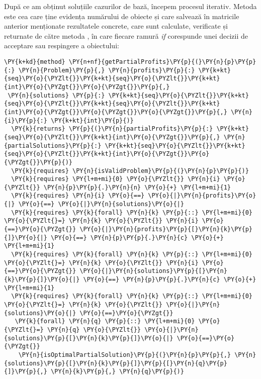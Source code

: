 \begin{sloppypar}
    \par După ce am obținut soluțiile cazurilor de bază, începem procesul iterativ. Metoda  este cea care ține evidența numărului de obiecte și care salvează în matricile anterior menționate rezultatele concrete, care sunt calculate, verificate și returnate de către metoda , în care fiecare ramură \textit{if} corespunde unei decizii de acceptare sau respingere a obiectului:
    \begin{Verbatim}[commandchars=\\\{\}]
\PY{k+kd}{method} \PY{n+nf}{getPartialProfits}\PY{p}{(}\PY{n}{p}\PY{p}{:} \PY{n}{Problem}\PY{p}{,} \PY{n}{profits}\PY{p}{:} \PY{k+kt}{seq}\PY{o}{\PYZlt{}}\PY{k+kt}{seq}\PY{o}{\PYZlt{}}\PY{k+kt}{int}\PY{o}{\PYZgt{}}\PY{o}{\PYZgt{}}\PY{p}{,} 
 \PY{n}{solutions} \PY{p}{:} \PY{k+kt}{seq}\PY{o}{\PYZlt{}}\PY{k+kt}{seq}\PY{o}{\PYZlt{}}\PY{k+kt}{seq}\PY{o}{\PYZlt{}}\PY{k+kt}{int}\PY{o}{\PYZgt{}}\PY{o}{\PYZgt{}}\PY{o}{\PYZgt{}}\PY{p}{,} \PY{n}{i}\PY{p}{:} \PY{k+kt}{int}\PY{p}{)} 
  \PY{k}{returns} \PY{p}{(}\PY{n}{partialProfits}\PY{p}{:} \PY{k+kt}{seq}\PY{o}{\PYZlt{}}\PY{k+kt}{int}\PY{o}{\PYZgt{}}\PY{p}{,} \PY{n}{partialSolutions}\PY{p}{:} \PY{k+kt}{seq}\PY{o}{\PYZlt{}}\PY{k+kt}{seq}\PY{o}{\PYZlt{}}\PY{k+kt}{int}\PY{o}{\PYZgt{}}\PY{o}{\PYZgt{}}\PY{p}{)}
  \PY{k}{requires} \PY{n}{isValidProblem}\PY{p}{(}\PY{n}{p}\PY{p}{)}
  \PY{k}{requires} \PY{l+m+mi}{0} \PY{o}{\PYZlt{}} \PY{n}{i} \PY{o}{\PYZlt{}} \PY{n}{p}\PY{p}{.}\PY{n}{n} \PY{o}{+} \PY{l+m+mi}{1}
  \PY{k}{requires} \PY{n}{i} \PY{o}{==} \PY{o}{|}\PY{n}{profits}\PY{o}{|} \PY{o}{==} \PY{o}{|}\PY{n}{solutions}\PY{o}{|}
  \PY{k}{requires} \PY{k}{forall} \PY{n}{k} \PY{p}{::} \PY{l+m+mi}{0} \PY{o}{\PYZlt{}=} \PY{n}{k} \PY{o}{\PYZlt{}} \PY{n}{i} \PY{o}{==}\PY{o}{\PYZgt{}} \PY{o}{|}\PY{n}{profits}\PY{p}{[}\PY{n}{k}\PY{p}{]}\PY{o}{|} \PY{o}{==} \PY{n}{p}\PY{p}{.}\PY{n}{c} \PY{o}{+} \PY{l+m+mi}{1}
  \PY{k}{requires} \PY{k}{forall} \PY{n}{k} \PY{p}{::} \PY{l+m+mi}{0} \PY{o}{\PYZlt{}=} \PY{n}{k} \PY{o}{\PYZlt{}} \PY{n}{i} \PY{o}{==}\PY{o}{\PYZgt{}} \PY{o}{|}\PY{n}{solutions}\PY{p}{[}\PY{n}{k}\PY{p}{]}\PY{o}{|} \PY{o}{==} \PY{n}{p}\PY{p}{.}\PY{n}{c} \PY{o}{+} \PY{l+m+mi}{1}
  \PY{k}{requires} \PY{k}{forall} \PY{n}{k} \PY{p}{::} \PY{l+m+mi}{0} \PY{o}{\PYZlt{}=} \PY{n}{k} \PY{o}{\PYZlt{}} \PY{o}{|}\PY{n}{solutions}\PY{o}{|} \PY{o}{==}\PY{o}{\PYZgt{}} 
   \PY{k}{forall} \PY{n}{q} \PY{p}{::} \PY{l+m+mi}{0} \PY{o}{\PYZlt{}=} \PY{n}{q} \PY{o}{\PYZlt{}} \PY{o}{|}\PY{n}{solutions}\PY{p}{[}\PY{n}{k}\PY{p}{]}\PY{o}{|} \PY{o}{==}\PY{o}{\PYZgt{}} 
    \PY{n}{isOptimalPartialSolution}\PY{p}{(}\PY{n}{p}\PY{p}{,} \PY{n}{solutions}\PY{p}{[}\PY{n}{k}\PY{p}{]}\PY{p}{[}\PY{n}{q}\PY{p}{]}\PY{p}{,} \PY{n}{k}\PY{p}{,} \PY{n}{q}\PY{p}{)} 

\end{Verbatim}
\end{sloppypar}
